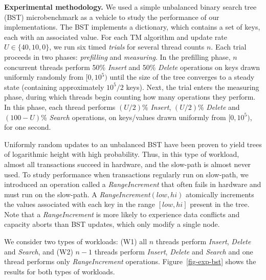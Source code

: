 \vspace{1mm}\noindent\textbf{Experimental methodology.}
We used a simple unbalanced binary search tree (BST) microbenchmark as a vehicle to study the performance of our implementations.
The BST implements a dictionary, which contains a set of keys, each with an associated value.
For each TM algorithm %
and update rate $U \in \{40, 10, 0\}$, we run six timed \textit{trials} for several thread counts $n$.
Each trial proceeds in two phases: \textit{prefilling} and \textit{measuring}.
In the prefilling phase, $n$ concurrent threads perform 50\% \textit{Insert} and 50\% \textit{Delete} operations on keys drawn uniformly randomly from $[0, 10^5)$ until the size of the tree converges to a steady state (containing approximately $10^5/2$ keys).
Next, the trial enters the measuring phase, during which threads begin counting how many operations they perform.
In this phase, each thread performs $(U/2)$\% \textit{Insert}, $(U/2)$\% \textit{Delete} and $(100-U)$\% \textit{Search} operations, on keys/values drawn uniformly from $[0,10^5)$, for one second.

Uniformly random updates to an unbalanced BST have been proven to yield trees of logarithmic height with high probability.
Thus, in this type of workload, almost all transactions succeed in hardware, and the slow-path is almost never used.
To study performance when transactions regularly run on slow-path, we introduced an operation called a \textit{RangeIncrement} that often fails in hardware and must run on the slow-path.
A \textit{RangeIncrement}$(low, hi)$ atomically increments the values 
associated with each key in the range $[low, hi]$ present in the tree.
Note that a \textit{RangeIncrement} is more likely to experience data 
conflicts and capacity aborts than BST updates, which only modify a single node.

We consider two types of workloads: (W1) all $n$ threads perform \textit{Insert}, \textit{Delete} and \textit{Search}, and (W2) $n-1$ threads perform \textit{Insert}, \textit{Delete} and \textit{Search} and one thread performs only \textit{RangeIncrement} operations.
Figure~\ref{fig-exp-bst} shows the results for both types of workloads.

